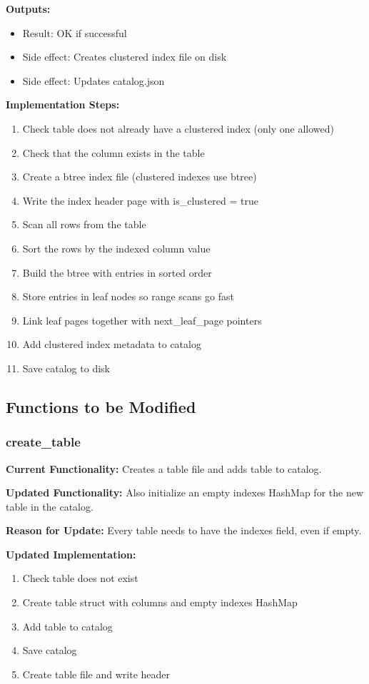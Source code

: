 \documentclass[11pt,a4paper]{article}
\begin{document}
\textbf{Outputs:}
\begin{itemize}
\item Result: OK if successful
\item Side effect: Creates clustered index file on disk
\item Side effect: Updates catalog.json
\end{itemize}

\textbf{Implementation Steps:}
\begin{enumerate}
\item Check table does not already have a clustered index (only one allowed)
\item Check that the column exists in the table
\item Create a btree index file (clustered indexes use btree)
\item Write the index header page with is\_clustered = true
\item Scan all rows from the table
\item Sort the rows by the indexed column value
\item Build the btree with entries in sorted order
\item Store entries in leaf nodes so range scans go fast
\item Link leaf pages together with next\_leaf\_page pointers
\item Add clustered index metadata to catalog
\item Save catalog to disk
\end{enumerate}

\subsection{Functions to be Modified}

\subsubsection{create\_table}

\textbf{Current Functionality:} Creates a table file and adds table to catalog.

\textbf{Updated Functionality:} Also initialize an empty indexes HashMap for the new table in the catalog.

\textbf{Reason for Update:} Every table needs to have the indexes field, even if empty.

\textbf{Updated Implementation:}
\begin{enumerate}
\item Check table does not exist
\item Create table struct with columns and empty indexes HashMap
\item Add table to catalog
\item Save catalog
\item Create table file and write header
\end{enumerate}
\end{document}
